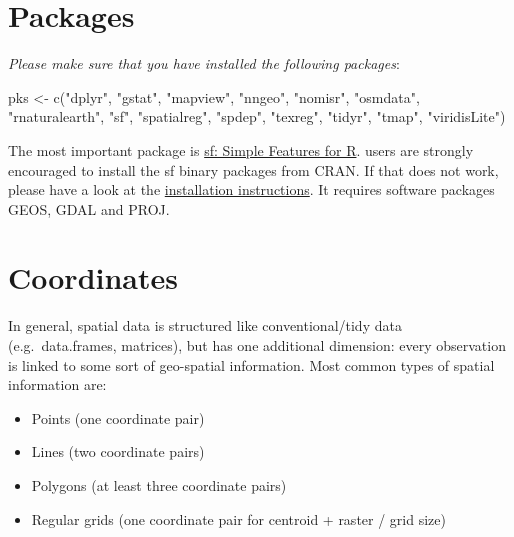 \documentclass[
  letterpaper,
  DIV=11,
  numbers=noendperiod]{scrreprt}
\newenvironment{Shaded}{\begin{snugshade}}{\end{snugshade}}
\newcommand{\FunctionTok}[1]{\textcolor[rgb]{0.28,0.35,0.67}{#1}}
\newcommand{\NormalTok}[1]{\textcolor[rgb]{0.00,0.23,0.31}{#1}}
\newcommand{\OtherTok}[1]{\textcolor[rgb]{0.00,0.23,0.31}{#1}}
\newcommand{\StringTok}[1]{\textcolor[rgb]{0.13,0.47,0.30}{#1}}
\begin{document}
\hypertarget{packages}{%
\section{Packages}\label{packages}}

\emph{Please make sure that you have installed the following packages}:

\begin{Shaded}
\begin{Highlighting}[]
\NormalTok{pks }\OtherTok{\textless{}{-}} \FunctionTok{c}\NormalTok{(}\StringTok{"dplyr"}\NormalTok{,}
\StringTok{"gstat"}\NormalTok{,}
\StringTok{"mapview"}\NormalTok{,}
\StringTok{"nngeo"}\NormalTok{,}
\StringTok{"nomisr"}\NormalTok{,}
\StringTok{"osmdata"}\NormalTok{,}
\StringTok{"rnaturalearth"}\NormalTok{,}
\StringTok{"sf"}\NormalTok{,}
\StringTok{"spatialreg"}\NormalTok{,}
\StringTok{"spdep"}\NormalTok{,}
\StringTok{"texreg"}\NormalTok{,}
\StringTok{"tidyr"}\NormalTok{,}
\StringTok{"tmap"}\NormalTok{,}
\StringTok{"viridisLite"}\NormalTok{)}
\end{Highlighting}
\end{Shaded}

The most important package is \href{https://r-spatial.github.io/sf/}{sf:
Simple Features for R}. users are strongly encouraged to install the sf
binary packages from CRAN. If that does not work, please have a look at
the \href{https://r-spatial.github.io/sf/}{installation instructions}.
It requires software packages GEOS, GDAL and PROJ.

\hypertarget{coordinates}{%
\section{Coordinates}\label{coordinates}}

In general, spatial data is structured like conventional/tidy data
(e.g.~data.frames, matrices), but has one additional dimension: every
observation is linked to some sort of geo-spatial information. Most
common types of spatial information are:

\begin{itemize}
\item
  Points (one coordinate pair)
\item
  Lines (two coordinate pairs)
\item
  Polygons (at least three coordinate pairs)
\item
  Regular grids (one coordinate pair for centroid + raster / grid size)
\end{itemize}
\end{document}
